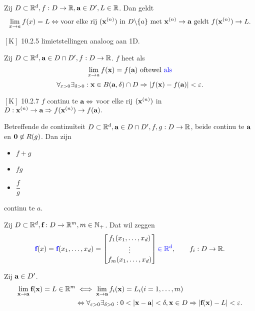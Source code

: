 \documentclass{2wa40summary}
\begin{document}
		\theorem Zij $D \subset \mathbb{R}^d, f:D\rightarrow \mathbb{R}, {\textbf{a}} \in D', L \in \mathbb{R}$. Dan geldt
		\[ \lim_{x \rightarrow a} f(x)=L \Leftrightarrow \text{voor elke rij } ({\textbf{x}}^{(n)}) \text{ in } D\backslash\{a\} \text{ met } {\textbf{x}}^{(n)}\rightarrow {\textbf{a}} \text{ geldt } f({\textbf{x}}^{(n)}) \rightarrow L.\]
		
		\opm $\left[\text{K}\right]$ 10.2.5 limietstellingen analoog aan 1D.
		
		 Zij $D \subset \mathbb{R}^d, {\textbf{a}}\in D\cap D',f:D\rightarrow \mathbb{R}$. $f$ heet  als \[\lim_{x\rightarrow a}f({\textbf{x}})=f({\textbf{a}}) \text{ oftewel {\color{blue}als}}\]
		\[\forall _{\varepsilon >0} \exists _{\delta >0}: {\textbf{x}} \in B({\textbf{a}},\delta)\cap D \Rightarrow |f({\textbf{x}})-f({\textbf{a}})|<\varepsilon.\]
		
		\theorem $\left[\text{K}\right]$ 10.2.7
			  $f$ continu te ${\textbf{a}}\Leftrightarrow$ voor elke rij $({\textbf{x}}^{(n)})$ in $D: {\textbf{x}}^{(n)}\rightarrow {\textbf{a}} \Rightarrow f({\textbf{x}}^{(n)}) \rightarrow f({\textbf{a}}).$
		
		\theorem Betreffende de continu\"iteit 
			  $D \subset \mathbb{R}^d, {\textbf{a}} \in D\cap D', f,g:D\rightarrow \mathbb{R}$, beide continu te ${\textbf{a}}$ en ${\textbf{0}} \not \in R(g)$.
			  Dan zijn
\begin{itemize}
\item $f+g$
\item $fg$
\item $\dfrac{f}{g}$
\end{itemize}
continu te $a$.
		
		  Zij $D \subset \mathbb{R}^d, {\textbf{f}}:D\rightarrow \mathbb{R}^m, m \in \mathbb{N}_+$. Dat wil zeggen
		\[{\color{blue}{\textbf{f}}}(x)={\color{blue}{\textbf{f}}}(x_1,\dots , x_d) =
				\begin{bmatrix}
					f_1(x_1,\dots , x_d) \\
					\vdots \\
					f_m(x_1,\dots , x_d) \\
				\end{bmatrix}{\color{blue}\in\mathbb{R}^d}, \qquad f_i:D\rightarrow \mathbb{R}.\]
				
		 Zij ${\textbf{a}} \in D'$.
			\begin{align*}
				\lim_{\x\to\a}\f(\x)=L \in \reals^m  &\iff \lim_{\x\to\a}f_i(\x)=L_i (i=1,\ldots ,m) \\
				&\Leftrightarrow \forall _{\varepsilon >0} \exists _{\delta >0}: 0<|\x-\a|<\delta, \x\in D \Rightarrow \abs{\f(\x)-L}<\varepsilon.
			\end{align*}
		
\end{document}
